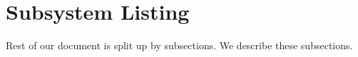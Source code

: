 
\section{Subsystem Listing}
\label{sec:subsystem_listing}

Rest of our document is split up by subsections. We describe these subsections. 